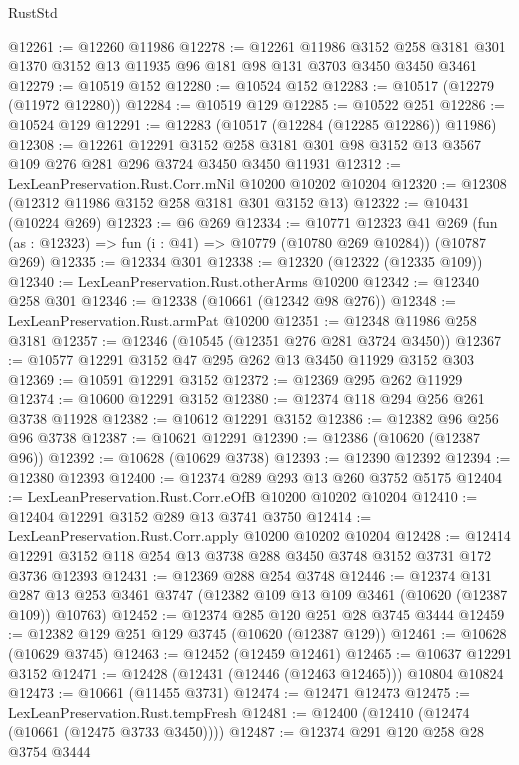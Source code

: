 \begin{lexlean}{RustStd}
\begin{coremodule}
@12261 := @12260 @11986
@12278 := @12261
    @11986
    @3152
    @258
    @3181
    @301
    @1370
    @3152
    @13
    @11935
    @96
    @181
    @98
    @131
    @3703
    @3450
    @3450
    @3461
@12279 := @10519 @152
@12280 := @10524 @152
@12283 := @10517 (@12279 (@11972 @12280))
@12284 := @10519 @129
@12285 := @10522 @251
@12286 := @10524 @129
@12291 := @12283 (@10517 (@12284 (@12285 @12286)) @11986)
@12308 := @12261
    @12291
    @3152
    @258
    @3181
    @301
    @98
    @3152
    @13
    @3567
    @109
    @276
    @281
    @296
    @3724
    @3450
    @3450
    @11931
@12312 := LexLeanPreservation.Rust.Corr.mNil @10200 @10202 @10204
@12320 := @12308 (@12312 @11986 @3152 @258 @3181 @301 @3152 @13)
@12322 := @10431 (@10224 @269)
@12323 := @6 @269
@12334 := @10771
    @12323
    @41
    @269
    (fun (as : @12323) => fun (i : @41) => @10779 (@10780 @269 @10284))
    (@10787 @269)
@12335 := @12334 @301
@12338 := @12320 (@12322 (@12335 @109))
@12340 := LexLeanPreservation.Rust.otherArms @10200
@12342 := @12340 @258 @301
@12346 := @12338 (@10661 (@12342 @98 @276))
@12348 := LexLeanPreservation.Rust.armPat @10200
@12351 := @12348 @11986 @258 @3181
@12357 := @12346 (@10545 (@12351 @276 @281 @3724 @3450))
@12367 := @10577 @12291 @3152 @47 @295 @262 @13 @3450 @11929 @3152 @303
@12369 := @10591 @12291 @3152
@12372 := @12369 @295 @262 @11929
@12374 := @10600 @12291 @3152
@12380 := @12374 @118 @294 @256 @261 @3738 @11928
@12382 := @10612 @12291 @3152
@12386 := @12382 @96 @256 @96 @3738
@12387 := @10621 @12291
@12390 := @12386 (@10620 (@12387 @96))
@12392 := @10628 (@10629 @3738)
@12393 := @12390 @12392
@12394 := @12380 @12393
@12400 := @12374 @289 @293 @13 @260 @3752 @5175
@12404 := LexLeanPreservation.Rust.Corr.eOfB @10200 @10202 @10204
@12410 := @12404 @12291 @3152 @289 @13 @3741 @3750
@12414 := LexLeanPreservation.Rust.Corr.apply @10200 @10202 @10204
@12428 := @12414 @12291 @3152 @118 @254 @13 @3738 @288 @3450 @3748 @3152 @3731 @172 @3736 @12393
@12431 := @12369 @288 @254 @3748
@12446 := @12374
    @131
    @287
    @13
    @253
    @3461
    @3747
    (@12382 @109 @13 @109 @3461 (@10620 (@12387 @109)) @10763)
@12452 := @12374 @285 @120 @251 @28 @3745 @3444
@12459 := @12382 @129 @251 @129 @3745 (@10620 (@12387 @129))
@12461 := @10628 (@10629 @3745)
@12463 := @12452 (@12459 @12461)
@12465 := @10637 @12291 @3152
@12471 := @12428 (@12431 (@12446 (@12463 @12465))) @10804 @10824
@12473 := @10661 (@11455 @3731)
@12474 := @12471 @12473
@12475 := LexLeanPreservation.Rust.tempFresh
@12481 := @12400 (@12410 (@12474 (@10661 (@12475 @3733 @3450))))
@12487 := @12374 @291 @120 @258 @28 @3754 @3444

\end{coremodule}
\end{lexlean}
